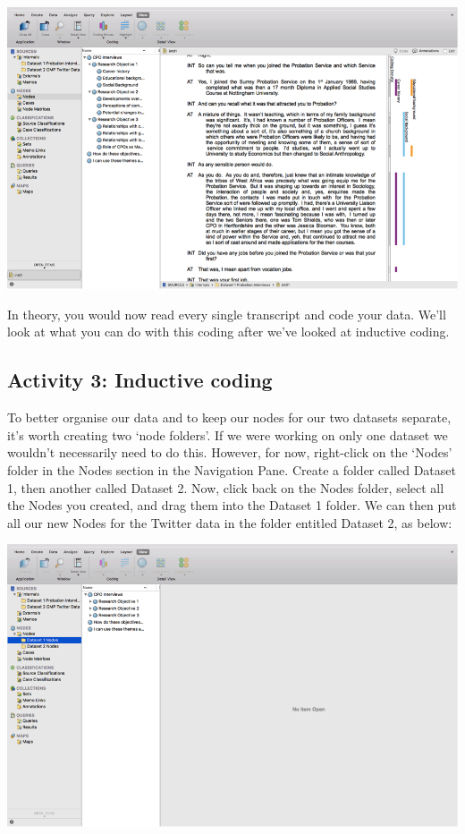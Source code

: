 \documentclass[]{book}
\theoremstyle{definition}
\theoremstyle{definition}
\theoremstyle{definition}
\theoremstyle{remark}
\begin{document}
\includegraphics{imgs/qual_47.png}

In theory, you would now read every single transcript and code your
data. We'll look at what you can do with this coding after we've looked
at inductive coding.

\hypertarget{activity-3-inductive-coding}{%
\subsection{Activity 3: Inductive
coding}\label{activity-3-inductive-coding}}

To better organise our data and to keep our nodes for our two datasets
separate, it's worth creating two `node folders'. If we were working on
only one dataset we wouldn't necessarily need to do this. However, for
now, right-click on the `Nodes' folder in the Nodes section in the
Navigation Pane. Create a folder called Dataset 1, then another called
Dataset 2. Now, click back on the Nodes folder, select all the Nodes you
created, and drag them into the Dataset 1 folder. We can then put all
our new Nodes for the Twitter data in the folder entitled Dataset 2, as
below:

\includegraphics{imgs/qual_48.png}
\end{document}
